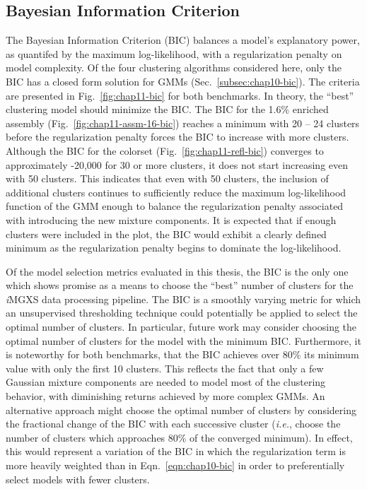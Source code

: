 \clearpage

\subsection{Bayesian Information Criterion}
\label{subsec:chap11-bic}

The Bayesian Information Criterion (BIC) balances a model's explanatory power, as quantifed by the maximum log-likelihood, with a regularization penalty on model complexity. Of the four clustering algorithms considered here, only the BIC has a closed form solution for \acp{GMM} (Sec.~\ref{subsec:chap10-bic}). The criteria are presented in Fig.~\ref{fig:chap11-bic} for both benchmarks. In theory, the ``best'' clustering model should minimize the BIC. The BIC for the 1.6\% enriched assembly (Fig.~\ref{fig:chap11-assm-16-bic}) reaches a minimum with 20 -- 24 clusters before the regularization penalty forces the BIC to increase with more clusters. Although the BIC for the colorset (Fig.~\ref{fig:chap11-refl-bic}) converges to approximately -20,000 for 30 or more clusters, it does not start increasing even with 50 clusters. This indicates that even with 50 clusters, the inclusion of additional clusters continues to sufficiently reduce the maximum log-likelihood function of the \ac{GMM} enough to balance the regularization penalty associated with introducing the new mixture components. It is expected that if enough clusters were included in the plot, the BIC would exhibit a clearly defined minimum as the regularization penalty begins to dominate the log-likelihood.

Of the model selection metrics evaluated in this thesis, the BIC is the only one which shows promise as a means to choose the ``best'' number of clusters for the \textit{i}\ac{MGXS} data processing pipeline. The BIC is a smoothly varying metric for which an unsupervised thresholding technique could potentially be applied to select the optimal number of clusters. In particular, future work may consider choosing the optimal number of clusters for the model with the minimum BIC. Furthermore, it is noteworthy for both benchmarks, that the BIC achieves over 80\% its minimum value with only the first 10 clusters. This reflects the fact that only a few Gaussian mixture components are needed to model most of the clustering behavior, with diminishing returns achieved by more complex \acp{GMM}. An alternative approach might choose the optimal number of clusters by considering the fractional change of the BIC with each successive cluster (\textit{i.e.}, choose the number of clusters which approaches 80\% of the converged minimum). In effect, this would represent a variation of the BIC in which the regularization term is more heavily weighted than in Eqn.~\ref{eqn:chap10-bic} in order to preferentially select models with fewer clusters.


